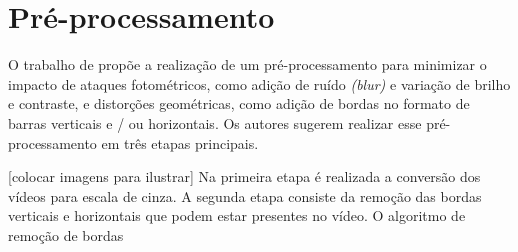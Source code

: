 \section{Pré-processamento}
\label{sec:preprocessamento}


O trabalho de \cite{Dutta2013} propõe a realização de um pré-processamento para minimizar o impacto de ataques fotométricos, como adição de ruído \textit{(blur)} e variação de brilho e contraste, e distorções geométricas, como adição de bordas no formato de barras verticais e / ou horizontais. Os autores sugerem realizar esse pré-processamento em três etapas principais.

[colocar imagens para ilustrar]
Na primeira etapa é realizada a conversão dos vídeos para escala de cinza. A segunda etapa consiste da remoção das bordas verticais e horizontais que podem estar presentes no vídeo. O algoritmo de remoção de bordas 